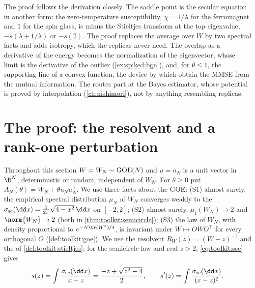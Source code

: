 \begin{refsection}
The proof follows the derivation closely. The saddle point is the secular equation in another form: the zero-temperature susceptibility, $\chi=1/\lambda$ for the ferromagnet and $1$ for the spin glass, is minus the Stieltjes transform at the top eigenvalue, $-s(\lambda+1/\lambda)$ or $-s(2)$. The proof replaces the average over $W$ by two spectral facts and adds isotropy, which the replicas never need. The overlap as a derivative of the energy becomes the normalization of the eigenvector, whose limit is the derivative of the outlier (\cref{ex:spiked:bgn}), and, for $\theta\le1$, the supporting line of a convex function, the device by which \textcite{LelargeMiolane2019} obtain the MMSE from the mutual information. The routes part at the Bayes estimator, whose potential is proved by interpolation (\cref{ch:nishimori}), not by anything resembling replicas.

\section{The proof: the resolvent and a rank-one perturbation}\label{sec:spiked:proof}

Throughout this section $W=W_N\sim\mathrm{GOE}(N)$ and $u=u_N$ is a unit vector in $\R^N$, deterministic or random, independent of $W_N$. For $\theta\ge0$ put $A_N(\theta)=W_N+\theta u_Nu_N^\top$. We use three facts about the GOE: (S1) almost surely, the empirical spectral distribution $\mu_N$ of $W_N$ converges weakly to the  $\spikedsc(\dd x)=\frac1{2\pi}\sqrt{4-x^2}\,\dd x$ on $[-2,2]$; (S2) almost surely, $\mu_1(W_N)\to2$ and $\norm{W_N}\to2$ (both in \cref{thm:toolkit:semicircle}); (S3) the law of $W_N$, with density proportional to $e^{-N\tr(W^2)/4}$, is invariant under $W\mapsto OWO^\top$ for every orthogonal $O$ (\cref{def:toolkit:goe}). We use the resolvent $R_W(z)=(W-z)^{-1}$ and the  of \cref{def:toolkit:stieltjes}; for the semicircle law and real $z>2$, \eqref{eq:toolkit:ssc} gives
\begin{equation}\label{eq:spiked:s}
s(z)=\int\frac{\spikedsc(\dd x)}{x-z}=\frac{-z+\sqrt{z^2-4}}2,\qquad s'(z)=\int\frac{\spikedsc(\dd x)}{(x-z)^2}.
\end{equation}


\end{refsection}
